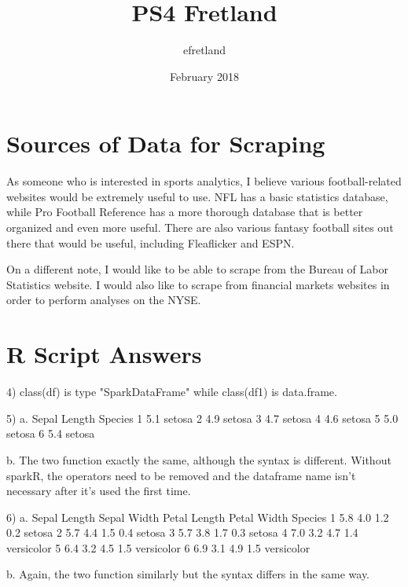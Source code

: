 \documentclass{article}
\title{PS4 Fretland}
\author{efretland }
\date{February 2018}
\begin{document}
\maketitle

\section{Sources of Data for Scraping}

As someone who is interested in sports analytics, I believe various football-related websites would be extremely useful to use. NFL has a basic statistics database, while Pro Football Reference has a more thorough database that is better organized and even more useful. There are also various fantasy football sites out there that would be useful, including Fleaflicker and ESPN. 

On a different note, I would like to be able to scrape from the Bureau of Labor Statistics website. I would also like to scrape from financial markets websites in order to perform analyses on the NYSE.


\section{R Script Answers}

4) class(df) is type "SparkDataFrame" while class(df1) is data.frame. 


5) a.   Sepal Length Species
1          5.1  setosa
2          4.9  setosa
3          4.7  setosa
4          4.6  setosa
5          5.0  setosa
6          5.4  setosa

    b. The two function exactly the same, although the syntax is different. Without sparkR, the operators need to be removed and the dataframe name isn't necessary after it's used the first time. 
    
    
    
6) a.   Sepal Length Sepal Width Petal Length Petal Width    Species
1          5.8         4.0          1.2         0.2     setosa
2          5.7         4.4          1.5         0.4     setosa
3          5.7         3.8          1.7         0.3     setosa
4          7.0         3.2          4.7         1.4 versicolor
5          6.4         3.2          4.5         1.5 versicolor
6          6.9         3.1          4.9         1.5 versicolor

    b. Again, the two function similarly but the syntax differs in the same way. 
    
    
    
\end{document}
